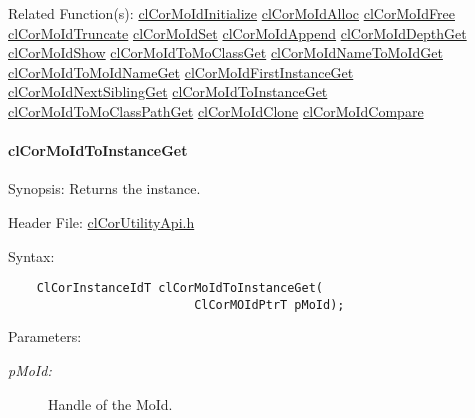 \begin{Desc}
\item[Related Function(s):]\hyperlink{group__group13}{cl\-Cor\-Mo\-Id\-Initialize} \hyperlink{group__group13}{cl\-Cor\-Mo\-Id\-Alloc} \hyperlink{group__group13}{cl\-Cor\-Mo\-Id\-Free} \hyperlink{group__group13}{cl\-Cor\-Mo\-Id\-Truncate} \hyperlink{group__group13}{cl\-Cor\-Mo\-Id\-Set} \hyperlink{group__group13}{cl\-Cor\-Mo\-Id\-Append} \hyperlink{group__group13}{cl\-Cor\-Mo\-Id\-Depth\-Get} \hyperlink{group__group13}{cl\-Cor\-Mo\-Id\-Show} \hyperlink{group__group13}{cl\-Cor\-Mo\-Id\-To\-Mo\-Class\-Get} \hyperlink{group__group13}{cl\-Cor\-Mo\-Id\-Name\-To\-Mo\-Id\-Get} \hyperlink{group__group13}{cl\-Cor\-Mo\-Id\-To\-Mo\-Id\-Name\-Get} \hyperlink{group__group13}{cl\-Cor\-Mo\-Id\-First\-Instance\-Get} \hyperlink{group__group13}{cl\-Cor\-Mo\-Id\-Next\-Sibling\-Get} \hyperlink{group__group13}{cl\-Cor\-Mo\-Id\-To\-Instance\-Get} \hyperlink{group__group13}{cl\-Cor\-Mo\-Id\-To\-Mo\-Class\-Path\-Get} \hyperlink{group__group13}{cl\-Cor\-Mo\-Id\-Clone} \hyperlink{group__group13}{cl\-Cor\-Mo\-Id\-Compare} \end{Desc}
\hypertarget{pagecor242}{}\paragraph{cl\-Cor\-Mo\-Id\-To\-Instance\-Get}\label{pagecor242}
\begin{Desc}
\item[Synopsis:]Returns the instance.\end{Desc}
\begin{Desc}
\item[Header File:]\hyperlink{cl_cor_utility_api_8h}{cl\-Cor\-Utility\-Api.h}\end{Desc}
\begin{Desc}
\item[Syntax:]

\footnotesize\begin{verbatim}    ClCorInstanceIdT clCorMoIdToInstanceGet(
                          ClCorMOIdPtrT pMoId);
\end{verbatim}
\normalsize
\end{Desc}
\begin{Desc}
\item[Parameters:]
\begin{description}
\item[{\em p\-Mo\-Id:}]Handle of the Mo\-Id.\end{description}
\end{Desc}
